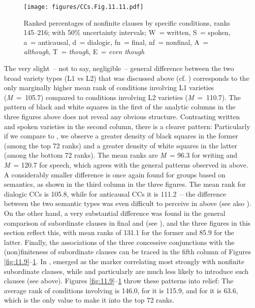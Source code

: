 \begin{figure}
\texttt{[image: figures/CCs.Fig.11.11.pdf]}
\caption{\label{bkm:Ref60636703}\label{fig:11.11}Ranked percentages of nonfinite clauses by specific conditions, ranks 145–216; with 50\% uncertainty intervals; W~= written, S~= spoken, a~= anticausal, d~= dialogic, fn~= final, nf~= nonfinal, A~= \textit{although}, T~= \textit{though}, E~= \textit{even though}}
 \end{figure}

The very slight~– not to say, negligible~– general difference between the two broad variety types (L1 vs L2) that was discussed above (cf. ) corresponds to the only marginally higher mean rank of conditions involving L1 varieties (\textit{M}~=~105.7) compared to conditions involving L2 varieties (\textit{M}~=~110.7). The pattern of black and white squares in the first of the analytic columns in the three figures above does not reveal any obvious structure. Contrasting written and spoken varieties in the second column, there is a clearer pattern: Particularly if we compare  to , we observe a greater density of black squares in the former (among  the top 72 ranks) and a greater density of white squares in the latter (among the bottom 72 ranks). The mean ranks are \textit{M}~= 96.3 for writing and \textit{M}~= 120.7 for speech, which agrees with the general patterns observed in  above. A considerably smaller difference is once again found for groups based on semantics, as shown in the third column in the three figures. The mean rank for dialogic CCs is 105.8, while for anticausal CCs it is 111.2~– the difference between the two semantic types was even difficult to perceive in  above (see also ). On the other hand, a very substantial difference was found in the general comparison of subordinate clauses in final and  (see ), and the three figures in this section reflect this, with mean ranks of 131.1 for the former and 85.9 for the latter. Finally, the associations of the three concessive conjunctions with the (non)finiteness of subordinate clauses can be traced in the fifth column of Figures \ref{fig:11.9}–\ref{fig:11.11}. In ,  emerged as the marker correlating most strongly with nonfinite subordinate clauses, while  and particularly  are much less likely to introduce such clauses (see  above). Figures \ref{fig:11.9}–\ref{fig:11.11} throw these patterns into relief: The average rank of conditions involving  is 146.0, for  it is 115.9, and for  it is 63.6, which is the only value to make it into the top 72 ranks.


